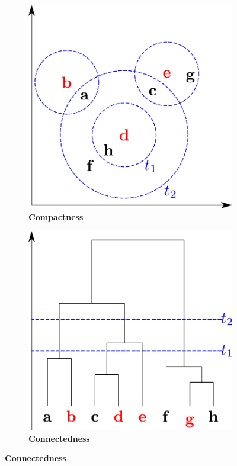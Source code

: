 \begin{figure}[!hbt]
    \centering
    \begin{subfigure}[b]{0.475\textwidth}
        \caption[Compactness]{\textbf{Compactness}}
        \label{subfig:Compactness}            
        \includegraphics[width=\textwidth]{Graphics/Compactness.pdf}
    \end{subfigure}
    \hfill
    \begin{subfigure}[b]{0.475\textwidth}
        \caption[Connectedness]{\textbf{Connectedness}}
        \label{subfig:Connectedness}            
        \includegraphics[width=\textwidth]{Graphics/Connectedness.pdf}

\end{subfigure}
\end{figure}
